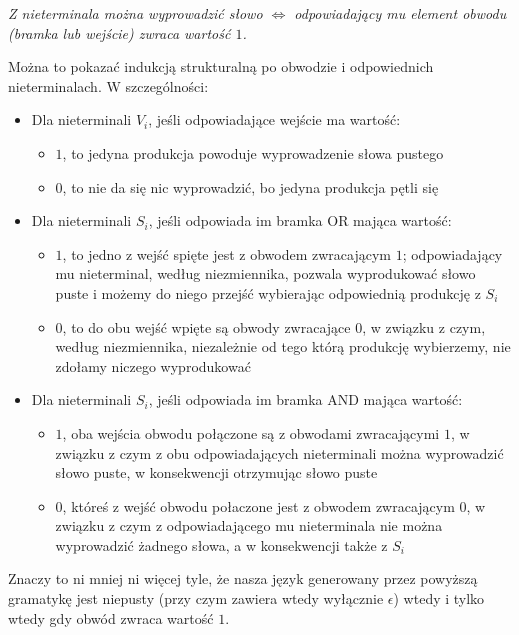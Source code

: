 \documentclass[a4paper,11pt]{article}
\begin{document}
{\it Z nieterminala można wyprowadzić słowo $\Longleftrightarrow$
 odpowiadający mu element obwodu (bramka lub wejście) zwraca wartość $1$.}

Można to pokazać indukcją strukturalną po obwodzie i odpowiednich
nieterminalach. W szczególności:
\begin{itemize}
  \item{Dla nieterminali $V_i$, jeśli odpowiadające wejście ma wartość:
    \begin{itemize}
      \item{$1$, to jedyna produkcja powoduje wyprowadzenie słowa pustego}
      \item{$0$, to nie da się nic wyprowadzić, bo jedyna produkcja pętli się}
    \end{itemize}
  }
  \item{Dla nieterminali $S_i$, jeśli odpowiada im bramka OR mająca wartość:
    \begin{itemize}
      \item{$1$, to jedno z wejść spięte jest z obwodem zwracającym $1$;
            odpowiadający mu nieterminal, według niezmiennika, pozwala
            wyprodukować słowo puste i możemy do niego przejść wybierając
            odpowiednią produkcję z $S_i$}
      \item{$0$, to do obu wejść wpięte są obwody zwracające $0$, w związku z
            czym, według niezmiennika, niezależnie od tego którą produkcję
            wybierzemy, nie zdołamy niczego wyprodukować}
    \end{itemize}
  }
  \item{Dla nieterminali $S_i$, jeśli odpowiada im bramka AND mająca wartość:
    \begin{itemize}
      \item{$1$, oba wejścia obwodu połączone są z obwodami zwracającymi $1$,
            w związku z czym z obu odpowiadających nieterminali można
            wyprowadzić słowo puste, w konsekwencji otrzymując słowo puste}
      \item{$0$, któreś z wejść obwodu połaczone jest z obwodem zwracającym $0$,
            w związku z czym z odpowiadającego mu nieterminala nie można
            wyprowadzić żadnego słowa, a w konsekwencji także z $S_i$}
    \end{itemize}
  }
\end{itemize}

Znaczy to ni mniej ni więcej tyle, że nasza język generowany przez powyższą
gramatykę jest niepusty (przy czym zawiera wtedy wyłącznie $\epsilon$) wtedy i
tylko wtedy gdy obwód zwraca wartość $1$. \\
\end{document}
